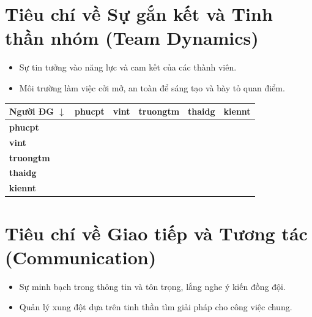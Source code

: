 \documentclass[12pt,a4paper]{article}
\begin{document}
\section*{Tiêu chí về Sự gắn kết và Tinh thần nhóm (Team Dynamics)}
\begin{itemize}[itemsep=0pt, parsep=0pt]
    \item Sự tin tưởng vào năng lực và cam kết của các thành viên.
    \item Môi trường làm việc cởi mở, an toàn để sáng tạo và bày tỏ quan điểm.
\end{itemize}

\begin{table}[H]
\centering
\renewcommand{\arraystretch}{1.15}
\begin{tabularx}{\textwidth}{|>{\centering\arraybackslash}X|>{\centering\arraybackslash}X|>{\centering\arraybackslash}X|>{\centering\arraybackslash}X|>{\centering\arraybackslash}X|>{\centering\arraybackslash}X|}
\hline
\rowcolor{gray!15} \textbf{Người ĐG $\downarrow$} & \textbf{phucpt} & \textbf{vint} & \textbf{truongtm} & \textbf{thaidg} & \textbf{kiennt} \\ \hline
\textbf{phucpt} &  &  &  &  &  \\ \hline
\textbf{vint} &  &  &  &  &  \\ \hline
\textbf{truongtm} &  &  &  &  &  \\ \hline
\textbf{thaidg} &  &  &  &  &  \\ \hline
\textbf{kiennt} &  &  &  &  &  \\ \hline
\end{tabularx}
\end{table}

\section*{Tiêu chí về Giao tiếp và Tương tác (Communication)}
\begin{itemize}[itemsep=0pt, parsep=0pt]
    \item Sự minh bạch trong thông tin và tôn trọng, lắng nghe ý kiến đồng đội.
    \item Quản lý xung đột dựa trên tinh thần tìm giải pháp cho công việc chung.
\end{itemize}
\end{document}
